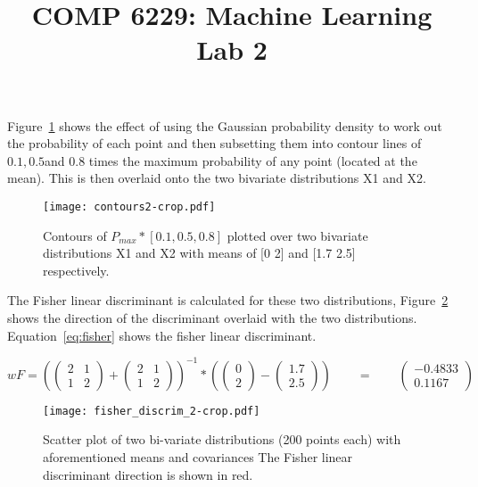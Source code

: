 \documentclass[a4paper,10pt]{article}
\title{COMP 6229: Machine Learning Lab 2}
\date{}
\author{}
\begin{document}
\maketitle
\thispagestyle{fancy}
Figure~\ref{fig:contour} shows the effect of using the Gaussian probability density to work out the probability of each point and then subsetting them into contour lines of $0.1, 0.5$and $0.8$ times the maximum probability of any point (located at the mean). This is then overlaid onto the two bivariate distributions X1 and X2.
\begin{figure}[ht!]
    \centering
    \texttt{[image: contours2-crop.pdf]}
    \caption{Contours of $P_{max} * [0.1, 0.5, 0.8]$ plotted over two bivariate distributions X1 and X2 with means of [0 2] and [1.7 2.5] respectively.\label{fig:contour}}
\end{figure}

The Fisher linear discriminant is calculated for these two distributions, Figure~\ref{fig:fisher} shows the direction of the discriminant overlaid with the two distributions. Equation~\ref{eq:fisher} shows the fisher linear discriminant.

\begin{equation}\label{eq:fisher}
wF = \left(\begin{pmatrix}
2 & 1\\
1 & 2
\end{pmatrix} +
\begin{pmatrix}
2 & 1\\
1 & 2
\end{pmatrix}\right)^{-1}
*\left(\begin{pmatrix}
0 \\
2
\end{pmatrix} -
\begin{pmatrix}
1.7 \\
2.5
\end{pmatrix} \right)
\qquad = \qquad \begin{pmatrix}
-0.4833 \\
0.1167
\end{pmatrix}
\end{equation}

\begin{figure}[ht!]
    \centering
    \texttt{[image: fisher\_discrim\_2-crop.pdf]}
    \caption{Scatter plot of two bi-variate distributions (200 points each) with aforementioned means and covariances The Fisher linear discriminant direction is shown in red.\label{fig:fisher}}
\end{figure}
\end{document}

